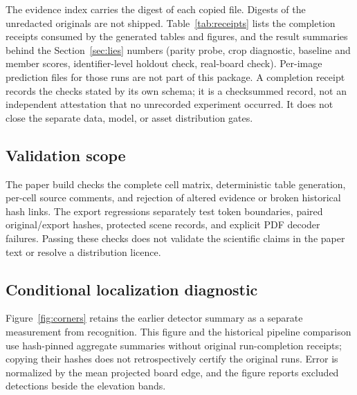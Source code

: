 The evidence index carries the digest of each copied file. Digests of the unredacted
originals are not shipped.
Table~\ref{tab:receipts} lists the completion receipts consumed by the generated tables
and figures, and the result summaries behind the Section~\ref{sec:lies} numbers (parity probe,
crop diagnostic, baseline and member scores, identifier-level holdout check, real-board check).
Per-image prediction files for those runs are not part of this package. A completion receipt records the checks stated by its own schema;
it is a checksummed record, not an independent attestation that no unrecorded
experiment occurred. It does not close the separate data, model, or asset
distribution gates.



\subsection{Validation scope}
The paper build checks the complete cell matrix, deterministic table generation,
per-cell source comments, and rejection of altered evidence or broken historical
hash links. The export regressions separately test token boundaries, paired
original/export hashes, protected scene records, and explicit PDF decoder
failures. Passing these checks does not validate the scientific claims in the
paper text or resolve a distribution licence.

\subsection{Conditional localization diagnostic}
Figure~\ref{fig:corners} retains the earlier detector summary as a separate
measurement from recognition. This figure and the historical pipeline comparison
use hash-pinned aggregate summaries without original run-completion receipts;
copying their hashes does not retrospectively certify the original runs. Error is normalized by the mean projected board
edge, and the figure reports excluded detections beside the elevation bands.


